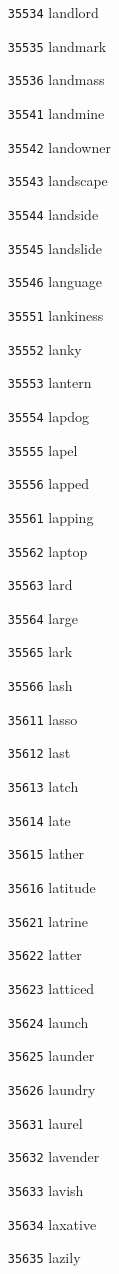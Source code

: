 \documentclass[twoside,11pt]{article}
\begin{document}
\begin{multicols}{5}
\begin{enumerate}
\item[\texttt{35534}] landlord
\item[\texttt{35535}] landmark
\item[\texttt{35536}] landmass
\item[\texttt{35541}] landmine
\item[\texttt{35542}] landowner
\item[\texttt{35543}] landscape
\item[\texttt{35544}] landside
\item[\texttt{35545}] landslide
\item[\texttt{35546}] language
\item[\texttt{35551}] lankiness
\item[\texttt{35552}] lanky
\item[\texttt{35553}] lantern
\item[\texttt{35554}] lapdog
\item[\texttt{35555}] lapel
\item[\texttt{35556}] lapped
\item[\texttt{35561}] lapping
\item[\texttt{35562}] laptop
\item[\texttt{35563}] lard
\item[\texttt{35564}] large
\item[\texttt{35565}] lark
\item[\texttt{35566}] lash
\item[\texttt{35611}] lasso
\item[\texttt{35612}] last
\item[\texttt{35613}] latch
\item[\texttt{35614}] late
\item[\texttt{35615}] lather
\item[\texttt{35616}] latitude
\item[\texttt{35621}] latrine
\item[\texttt{35622}] latter
\item[\texttt{35623}] latticed
\item[\texttt{35624}] launch
\item[\texttt{35625}] launder
\item[\texttt{35626}] laundry
\item[\texttt{35631}] laurel
\item[\texttt{35632}] lavender
\item[\texttt{35633}] lavish
\item[\texttt{35634}] laxative
\item[\texttt{35635}] lazily

\end{enumerate}
\end{multicols}
\end{document}
